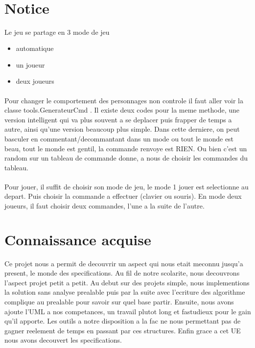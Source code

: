 \documentclass[a4paper,titlepage,openany,12pt]{report}
\begin{document}
\\
\section*{Notice}
\paragraph{}
Le jeu se partage en 3 mode de jeu
\begin{itemize}
\item automatique
\item un joueur
\item deux joueurs
\end{itemize}

\paragraph{}
Pour changer le comportement des personnages non controle il faut
aller voir la classe tools.GenerateurCmd .
Il existe deux codes pour la meme methode, une version intelligent qui
va plus souvent a se deplacer puis frapper de temps a autre, ainsi
qu'une version beaucoup plus simple. Dans cette derniere, on peut
basculer en commentant/decommantant dans un mode ou tout le monde est
beau, tout le monde est gentil, la commande renvoye est RIEN. Ou bien
c'est un random sur un tableau de commande donne, a nous de choisir
les commandes du tableau.

\paragraph{}
Pour jouer, il suffit de choisir son mode de jeu, le mode 1 jouer est
selectionne au depart. Puis choisir la commande a effectuer (clavier
ou souris).
En mode deux joueurs, il faut choisir deux commandes, l'une a la suite
de l'autre.


\section*{Connaissance acquise}
\paragraph{}
Ce projet nous a permit de decouvrir un aspect qui nous etait meconnu
jusqu'a present, le monde des specifications.
Au fil de notre scolarite, nous decouvrons l'aspect projet petit a
petit.
Au debut sur des projets simple, nous implementions la solution sans
analyse prealable puis par la suite avec l'ecriture des algorithme
complique au prealable pour savoir sur quel base partir.
Ensuite, nous avons ajoute l'UML a nos competances, un travail plutot
long et fastudieux pour le gain qu'il apporte. Les outils a notre
disposition a la fac ne nous permettant pas de gagner reelement de
temps en passant par ces structures.
Enfin grace a cet UE nous avons decouvert les specifications.
\end{document}
